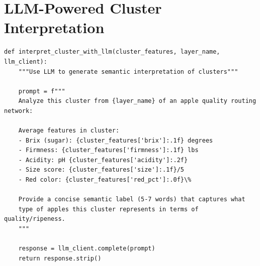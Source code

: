 \documentclass[11pt,a4paper]{article}
\begin{document}
\section{LLM-Powered Cluster Interpretation}

\begin{lstlisting}
def interpret_cluster_with_llm(cluster_features, layer_name, llm_client):
    """Use LLM to generate semantic interpretation of clusters"""
    
    prompt = f"""
    Analyze this cluster from {layer_name} of an apple quality routing network:
    
    Average features in cluster:
    - Brix (sugar): {cluster_features['brix']:.1f} degrees
    - Firmness: {cluster_features['firmness']:.1f} lbs
    - Acidity: pH {cluster_features['acidity']:.2f}
    - Size score: {cluster_features['size']:.1f}/5
    - Red color: {cluster_features['red_pct']:.0f}\%
    
    Provide a concise semantic label (5-7 words) that captures what 
    type of apples this cluster represents in terms of quality/ripeness.
    """
    
    response = llm_client.complete(prompt)
    return response.strip()
\end{lstlisting}
\end{document}
